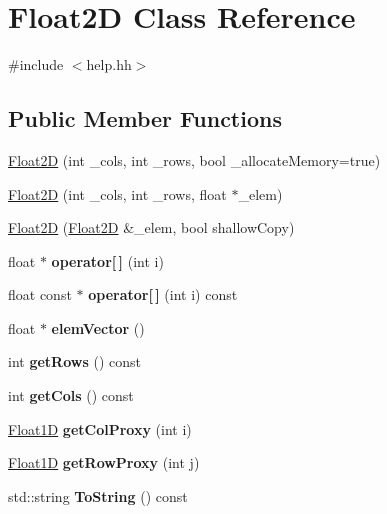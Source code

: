 \hypertarget{classFloat2D}{\section{Float2\-D Class Reference}
\label{classFloat2D}
}


{\ttfamily \#include $<$help.\-hh$>$}

\subsection*{Public Member Functions}
\begin{DoxyCompactItemize}
\item 
\hyperlink{classFloat2D_aceac75782e5db5cb644a893de73f7933}{Float2\-D} (int \-\_\-cols, int \-\_\-rows, bool \-\_\-allocate\-Memory=true)
\item 
\hyperlink{classFloat2D_a51ccca3defa8be28c89f63f1768a79b0}{Float2\-D} (int \-\_\-cols, int \-\_\-rows, float $\ast$\-\_\-elem)
\item 
\hyperlink{classFloat2D_aa4c91cf3f61da6180d2d3e92699d7c92}{Float2\-D} (\hyperlink{classFloat2D}{Float2\-D} \&\-\_\-elem, bool shallow\-Copy)
\item 
\hypertarget{classFloat2D_a0c514deed419976c1de95a476148edb7}{float $\ast$ {\bfseries operator\mbox{[}$\,$\mbox{]}} (int i)}\label{classFloat2D_a0c514deed419976c1de95a476148edb7}

\item 
\hypertarget{classFloat2D_a2890be398d2b6381253169f26225e93b}{float const $\ast$ {\bfseries operator\mbox{[}$\,$\mbox{]}} (int i) const }\label{classFloat2D_a2890be398d2b6381253169f26225e93b}

\item 
\hypertarget{classFloat2D_ab7ea635b12555d35bae9c4ef87024b07}{float $\ast$ {\bfseries elem\-Vector} ()}\label{classFloat2D_ab7ea635b12555d35bae9c4ef87024b07}

\item 
\hypertarget{classFloat2D_a9f523397af4e14fb2006ad4484f95380}{int {\bfseries get\-Rows} () const }\label{classFloat2D_a9f523397af4e14fb2006ad4484f95380}

\item 
\hypertarget{classFloat2D_af029eb7eb99dc96e95095796d7ea93fa}{int {\bfseries get\-Cols} () const }\label{classFloat2D_af029eb7eb99dc96e95095796d7ea93fa}

\item 
\hypertarget{classFloat2D_abea4f5de8e07341d0564a87065af6091}{\hyperlink{classFloat1D}{Float1\-D} {\bfseries get\-Col\-Proxy} (int i)}\label{classFloat2D_abea4f5de8e07341d0564a87065af6091}

\item 
\hypertarget{classFloat2D_a6c3329adba1854ea3e9589fd7271765b}{\hyperlink{classFloat1D}{Float1\-D} {\bfseries get\-Row\-Proxy} (int j)}\label{classFloat2D_a6c3329adba1854ea3e9589fd7271765b}

\item 
\hypertarget{classFloat2D_a4c9e36406c2cad64d759e9ce626fcdc5}{std\-::string {\bfseries To\-String} () const }\label{classFloat2D_a4c9e36406c2cad64d759e9ce626fcdc5}

\end{DoxyCompactItemize}
